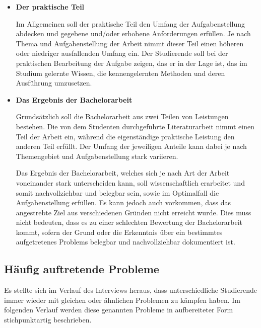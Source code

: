 \documentclass{scrreprt}
\begin{document}
\begin{itemize}
\item \textbf{Der praktische Teil}
\par Im Allgemeinen soll der praktische Teil den Umfang der Aufgabenstellung abdecken und gegebene und/oder erhobene Anforderungen erfüllen. Je nach Thema und Aufgabenstellung der Arbeit nimmt dieser Teil einen höheren oder niedriger ausfallenden Umfang ein.
Der Studierende soll bei der praktischen Bearbeitung der Aufgabe zeigen, das er in der Lage ist, das im Studium gelernte Wissen, die kennengelernten Methoden und deren Ausführung umzusetzen. 
\item \textbf{Das Ergebnis der Bachelorarbeit}
\par Grundsätzlich soll die Bachelorarbeit aus zwei Teilen von Leistungen bestehen. Die von dem Studenten durchgeführte Literaturarbeit nimmt einen Teil der Arbeit ein, während die eigenständige praktische Leistung den anderen Teil erfüllt. Der Umfang der jeweiligen Anteile kann dabei je nach Themengebiet und Aufgabenstellung stark variieren.
\par Das Ergebnis der Bachelorarbeit, welches sich je nach Art der Arbeit voneinander stark unterscheiden kann, soll wissenschaftlich erarbeitet und somit nachvollziehbar und belegbar sein, sowie im Optimalfall die Aufgabenstellung erfüllen. Es kann jedoch auch vorkommen, dass das angestrebte Ziel aus verschiedenen Gründen nicht erreicht wurde. Dies muss nicht bedeuten, dass es zu einer schlechten Bewertung der Bachelorarbeit kommt, sofern der Grund oder die Erkenntnis über ein bestimmtes aufgetretenes Problems belegbar und nachvollziehbar dokumentiert ist.
\end{itemize}

\subsection{Häufig auftretende Probleme}
\par Es stellte sich im Verlauf des Interviews heraus, dass unterschiedliche Studierende immer wieder mit gleichen oder ähnlichen Problemen zu kämpfen haben. Im folgenden Verlauf werden diese genannten Probleme in aufbereiteter Form stichpunktartig beschrieben.
\end{document}
